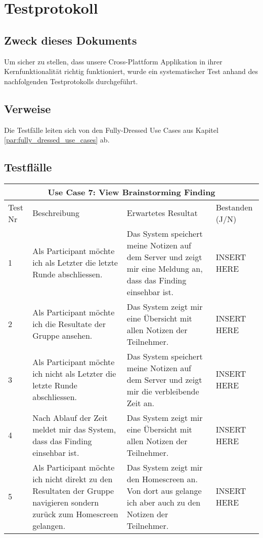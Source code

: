 \section{Testprotokoll}
\subsection{Zweck dieses Dokuments}
Um sicher zu stellen, dass unsere Cross-Plattform Applikation in ihrer Kernfunktionalität richtig funktioniert, wurde ein systematischer Test anhand des nachfolgenden Testprotokolls durchgeführt.

\subsection{Verweise}
Die Testfälle leiten sich von den Fully-Dressed Use Cases aus Kapitel \ref{par:fully_dressed_use_cases} ab.

\subsection{Testflälle}

\renewcommand{\arraystretch}{1.35}
\begin{center}
	\begin{longtable}{| p{1cm} | p{5cm} | p{5cm} | p{2cm} |}
		\hline
		\multicolumn{4}{|c|}{\textbf{Use Case 7: View Brainstorming Finding}}\\
		\hline\hline
		Test Nr & Beschreibung & Erwartetes Resultat & Bestanden (J/N) \\
		\hline
		1 & Als Participant möchte ich als Letzter die letzte Runde abschliessen. & Das System speichert meine Notizen auf dem Server und zeigt mir eine Meldung an, dass das Finding einsehbar ist. & INSERT HERE \\
		\hline
		2 & Als Participant möchte ich die Resultate der Gruppe ansehen. & Das System zeigt mir eine Übersicht mit allen Notizen der Teilnehmer. & INSERT HERE\\
		\hline
		3 & Als Participant möchte ich nicht als Letzter die letzte Runde abschliessen. & Das System speichert meine Notizen auf dem Server und zeigt mir die verbleibende Zeit an. & INSERT HERE\\
		\hline
		4 & Nach Ablauf der Zeit meldet mir das System, dass das Finding einsehbar ist. & Das System zeigt mir eine Übersicht mit allen Notizen der Teilnehmer. & INSERT HERE \\
		\hline
		5 & Als Participant möchte ich nicht direkt zu den Resultaten der Gruppe navigieren sondern zurück zum Homescreen gelangen. & Das System zeigt mir den Homescreen an. Von dort aus gelange ich aber auch zu den Notizen der Teilnehmer. & INSERT HERE  \\
		\hline
	\end{longtable}
\end{center}


